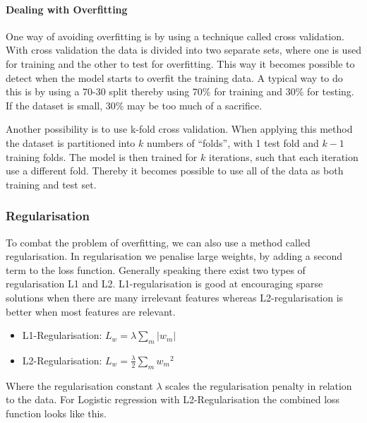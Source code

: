 \paragraph{Dealing with Overfitting}

One way of avoiding overfitting is by using a technique called cross validation. 
With cross validation the data is divided into two separate sets, where one is used for training and the other to test for overfitting. 
This way it becomes possible to detect when the model starts to overfit the training data.
A typical way to do this is by using a 70-30 split thereby using 70\% for training and 30\% for testing.
If the dataset is small, 30\% may be too much of a sacrifice.

Another possibility is to use k-fold cross validation.
When applying this method the dataset is partitioned into $k$ numbers of ``folds'', with 1 test fold and $k-1$ training folds.
The model is then trained for $k$ iterations, such that each iteration use a different fold.
Thereby it becomes possible to use all of the data as both training and test set.

\subsubsection{Regularisation}

To combat the problem of overfitting, we can also use a method called regularisation.
In regularisation we penalise large weights, by adding a second term to the loss function.
Generally speaking there exist two types of regularisation L1 and L2.
L1-regularisation is good at encouraging sparse solutions when there are many irrelevant features whereas L2-regularisation is better when most features are relevant.

\begin{itemize}
\item L1-Regularisation: $L_w = \lambda \sum_{m} \vert w_m \vert $ \\
\item L2-Regularisation: $L_w = \frac{\lambda}{2} \sum_{m} {w_m}^2$
\end{itemize}

Where the regularisation constant $\lambda$ scales the regularisation penalty in relation to the data. For Logistic regression with L2-Regularisation the combined loss function looks like this.

